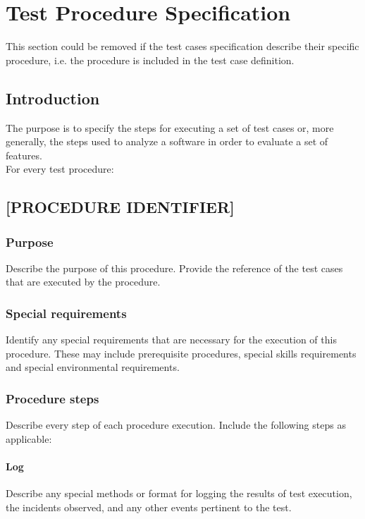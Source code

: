 \documentclass[DM,lsstdraft,STS,toc]{lsstdoc}
\begin{document}
\newpage

\section{Test Procedure Specification \label{proc_spec}}

This section could be removed if the test cases specification describe their specific procedure, i.e. the procedure is included
in the test case definition.

\subsection{Introduction \label{sect:peroc_intro}}
The purpose is to specify the steps for executing a set of test cases or, more generally, the steps used to analyze a software in order
to evaluate a set of features.\\
For every test procedure:

\subsection{[PROCEDURE IDENTIFIER] \label{sect:procedureid}}

\subsubsection{Purpose \label{sect:proc_purpose}}
Describe the purpose of this procedure. Provide the reference of the test cases that are executed by the procedure.

\subsubsection{Special requirements \label{sect:proc_reqs}}
Identify any special requirements that are necessary for the execution of this procedure. These may include prerequisite procedures,
special skills requirements and special environmental requirements.

\subsubsection{Procedure steps \label{sect:proc_steps}}
Describe every step of each procedure execution. Include the following steps as applicable:
\paragraph{Log \label{sect:proc_log}}
Describe any special methods or format for logging the results of test execution, the incidents observed, and any other events
pertinent to the test.
\end{document}
